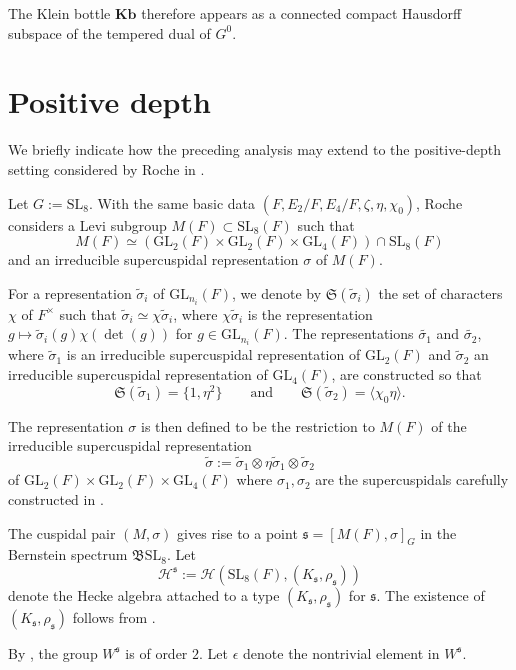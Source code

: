 \documentclass[11pt]{amsart}
\theoremstyle{remark}
\theoremstyle{definition}
\def\fB{\mathfrak{B}}
\newcommand{\cH}{\mathcal{H}}
\newcommand{\SL}{\mathrm{SL}}
\newcommand{\GL}{\mathrm{GL}}
\newcommand{\fs}{\mathfrak{s}}
\def\fB{\mathfrak{B}}
\begin{document}
The Klein bottle $\mathbf{Kb}$ therefore appears as a  connected compact Hausdorff subspace of the tempered dual of $G^0$.   

 


\section{Positive depth}

We briefly indicate how the preceding analysis may extend to the
positive-depth setting considered by Roche in \cite[\S4.1]{R}.

Let $G:=\SL_8$. With the same basic data $(F,E_2/F,E_4/F,\zeta,\eta,\chi_0)$,
Roche considers  a Levi subgroup $M(F) \subset \SL_8(F)$ such that 
\[M(F)\simeq (\GL_2(F)\times \GL_2(F)\times \GL_4(F))\cap \SL_8(F)\]
and an irreducible supercuspidal representation $\sigma$ of $M(F)$.

For a representation $\widetilde \sigma_i$ of $\GL_{n_i}(F)$, we denote by $\mathfrak{S}(\widetilde \sigma_i)$ the set of characters  $\chi$ of $F^\times$ such that $\widetilde \sigma_i\simeq\chi\widetilde \sigma_i$, where $\chi\widetilde \sigma_i$ 
is the representation $g\mapsto\widetilde \sigma_i(g)\chi(\det(g))$ for $g\in\GL_{n_i}(F)$.   The representations $\widetilde{\sigma_1}$ and $\widetilde{\sigma_2}$, where
$\widetilde\sigma_1$ is an irreducible  supercuspidal representation of $\GL_2(F)$ and  $\widetilde\sigma_2$ an irreducible supercuspidal representation of $\GL_4(F)$, are constructed so that
 \[
 \mathfrak{S}(\widetilde\sigma_1) = \{1,\eta^2\}\quad \quad \textrm{and} \quad \quad \mathfrak{S}(\widetilde\sigma_2) = \langle \chi_0\eta\rangle.
 \]


The representation $\sigma$ is then defined to be the restriction to $M(F)$ of the irreducible supercuspidal representation 
\[\widetilde\sigma:=\widetilde\sigma_1 \otimes \eta\widetilde\sigma_1 \otimes \widetilde\sigma_2\] 
of $\GL_2(F) \times \GL_2(F) \times \GL_4(F)$ where $\sigma_1, \sigma_2$ are the supercuspidals carefully constructed  in \cite[\S4.1]{R}.



 
The  cuspidal pair $(M,\sigma)$ gives rise to a point $\fs=[M(F),\sigma]_G$ in the Bernstein spectrum $\fB\SL_8$.  
Let
\[
\cH^\fs := \cH(\SL_8(F),(K_\fs,\rho_\fs))
\]
denote the Hecke algebra attached to a type $(K_\fs,\rho_\fs)$
for $\fs$.   The existence of $(K_\fs,\rho_\fs)$ follows from \cite[Theorem~4.4]{GR1}.

By \cite[\S4.2]{R}, the group $W^\fs$ is of order $2$.  Let $\epsilon$ denote the nontrivial element in $W^\fs$.   
\end{document}
